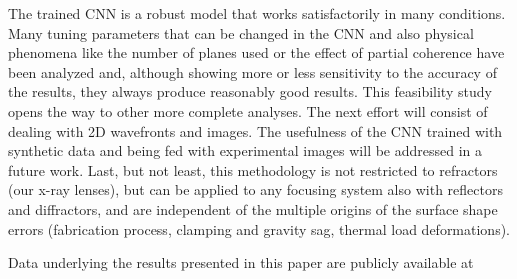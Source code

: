 \documentclass{iucr}
\newcommand{\inred}[1]{{\color{black}#1}}
\begin{document}
The trained CNN is a robust model that works satisfactorily in many conditions. Many tuning parameters that can be changed in the CNN and also physical phenomena like the number of planes used or the effect of partial coherence have been analyzed and, although showing more or less sensitivity to the accuracy of the results, they always produce reasonably good results. This feasibility study opens the way to other more complete analyses. The next effort will consist of dealing with 2D wavefronts and images.  
The usefulness of the CNN trained with synthetic data and being fed with  experimental images will be addressed in a future work.
\inred{Last, but not least, this methodology is not restricted to refractors (our x-ray lenses), but can be applied to any focusing system also with reflectors and diffractors, and are independent of the multiple origins of the surface shape errors (fabrication process, clamping and gravity sag, thermal load deformations). }








Data underlying the results presented in this paper are publicly available at
\small{}


\end{document}
